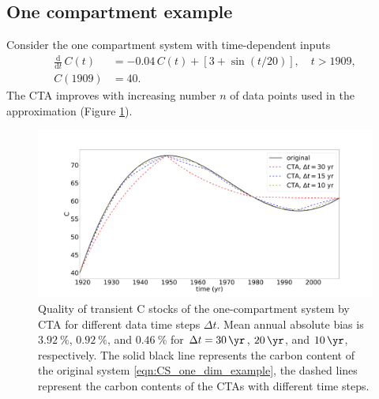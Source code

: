\documentclass[11pt,a4paper]{article}
\newcommand{\deriv}[1]{\frac{\mathrm{d}}{\mathrm{d}#1}}
\begin{document}
\subsection{One compartment example}
Consider the one compartment system with time-dependent inputs
\begin{equation}\label{eqn:CS_one_dim_example}
    \begin{aligned}
        \deriv{t}\,C(t) &= -0.04\,C(t) + \left[3+\sin(t/20)\right],\quad t>1909,\\
        C(1909) &= 40.
    \end{aligned}
\end{equation}
 The CTA improves with increasing number $n$ of data points used in the approximation (Figure \ref{fig:CS_one_dim_example}).
\begin{figure}[htbp]
    \centering 
    \includegraphics[width=1.0\linewidth]{figs/interpol_pwc_1.pdf}
    \caption{Quality of transient C stocks of the one-compartment system by CTA for different data time steps $\Delta t$.
    Mean annual absolute bias is $\SI{3.92}{\percent}$, $\SI{0.92}{\percent}$, and $\SI{0.46}{\percent}$ for $\Delta{t} = \SI{30}{\yr}$, $\SI{20}{\yr}$, and $\SI{10}{\yr}$, respectively.
    The solid black line represents the carbon content of the original system \eqref{eqn:CS_one_dim_example}, the dashed lines represent the carbon contents of the CTAs with different time steps.
    }    
    \label{fig:CS_one_dim_example}
\end{figure}        
\end{document}
